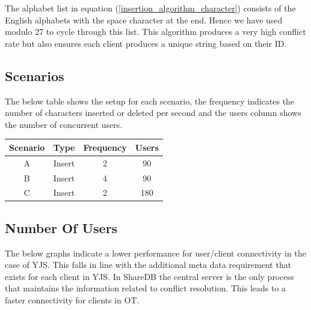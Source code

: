 \documentclass[12pt]{article}
\begin{document}
  The alphabet list in equation (\ref{insertion_algorithm_character}) consists of the English alphabets with the space character at the end.
  Hence we have used modulo 27 to cycle through this list. This algorithm produces a very high conflict rate but also ensures each client 
  produces a unique string based on their ID.

  \subsection{Scenarios}
  The below table shows the setup for each scenario, the frequency indicates the number of characters 
  inserted or deleted per second and the users column shows the number of concurrent users.\\

  \begin{tabular}{||c c c c||} 
    \hline
    Scenario & Type & Frequency & Users \\ [0.5ex] 
    \hline\hline
    A & Insert & 2 & 90 \\ 
    \hline
    B & Insert & 4 & 90 \\
    \hline
    C & Insert & 2 & 180 \\
    \hline
  \end{tabular}

  \subsection{Number Of Users}
  The below graphs indicate a lower performance for user/client connectivity in the case of YJS.
  This falls in line with the additional meta data requirement that exists for each client in YJS.
  In ShareDB the central server is the only process that maintains the information related to conflict resolution.
  This leads to a faster connectivity for clients in OT.
\end{document}
